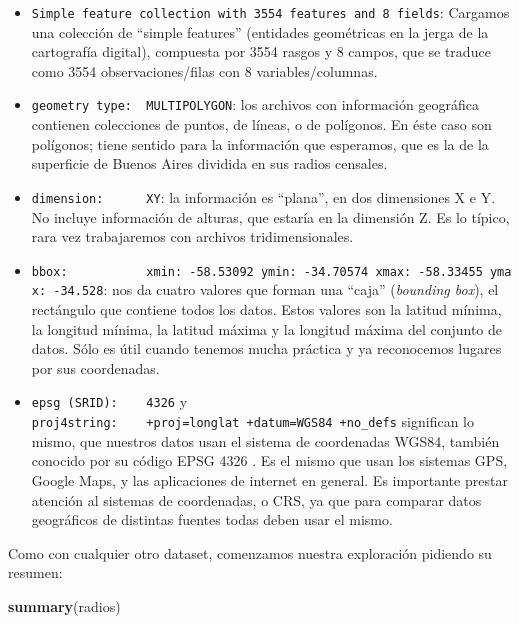 \documentclass[spanish,]{book}
\newenvironment{Shaded}{\begin{snugshade}}{\end{snugshade}}
\newcommand{\KeywordTok}[1]{\textcolor[rgb]{0.13,0.29,0.53}{\textbf{#1}}}
\newcommand{\NormalTok}[1]{#1}
\providecommand{\tightlist}{%
  \setlength{\itemsep}{0pt}\setlength{\parskip}{0pt}}
\begin{document}
\begin{itemize}
\tightlist
\item
  \texttt{Simple\ feature\ collection\ with\ 3554\ features\ and\ 8\ fields}: Cargamos una colección de ``simple features'' (entidades geométricas en la jerga de la cartografía digital), compuesta por 3554 rasgos y 8 campos, que se traduce como 3554 observaciones/filas con 8 variables/columnas.
\item
  \texttt{geometry\ type:\ \ MULTIPOLYGON}: los archivos con información geográfica contienen colecciones de puntos, de líneas, o de polígonos. En éste caso son polígonos; tiene sentido para la información que esperamos, que es la de la superficie de Buenos Aires dividida en sus radios censales.
\item
  \texttt{dimension:\ \ \ \ \ \ XY}: la información es ``plana'', en dos dimensiones X e Y. No incluye información de alturas, que estaría en la dimensión Z. Es lo típico, rara vez trabajaremos con archivos tridimensionales.
\item
  \texttt{bbox:\ \ \ \ \ \ \ \ \ \ \ xmin:\ -58.53092\ ymin:\ -34.70574\ xmax:\ -58.33455\ ymax:\ -34.528}: nos da cuatro valores que forman una ``caja'' (\emph{bounding box}), el rectángulo que contiene todos los datos. Estos valores son la latitud mínima, la longitud mínima, la latitud máxima y la longitud máxima del conjunto de datos. Sólo es útil cuando tenemos mucha práctica y ya reconocemos lugares por sus coordenadas.
\item
  \texttt{epsg\ (SRID):\ \ \ \ 4326} y \texttt{proj4string:\ \ \ \ +proj=longlat\ +datum=WGS84\ +no\_defs} significan lo mismo, que nuestros datos usan el sistema de coordenadas WGS84, también conocido por su código EPSG 4326 . Es el mismo que usan los sistemas GPS, Google Maps, y las aplicaciones de internet en general. Es importante prestar atención al sistemas de coordenadas, o CRS, ya que para comparar datos geográficos de distintas fuentes todas deben usar el mismo.
\end{itemize}

Como con cualquier otro dataset, comenzamos nuestra exploración pidiendo su resumen:

\begin{Shaded}
\begin{Highlighting}[]
\KeywordTok{summary}\NormalTok{(radios)}
\end{Highlighting}
\end{Shaded}
\end{document}
